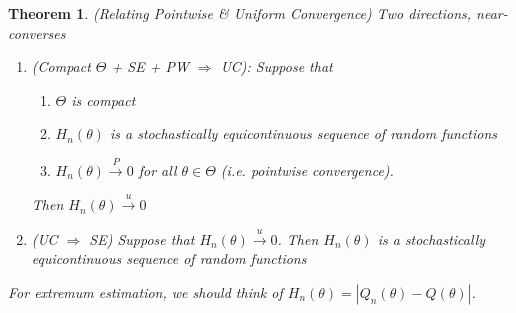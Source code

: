 \documentclass[12pt]{article}
\theoremstyle{plain}
\newtheorem{thm}{Theorem}[section]
\theoremstyle{definition}
\theoremstyle{remark}
\newcommand{\pto}{\xrightarrow{P}}
\newcommand{\uto}{\xrightarrow{u}}
\begin{document}
\clearpage
\begin{thm}\emph{(Relating Pointwise \& Uniform Convergence)}
Two directions, near-converses
\begin{enumerate}[label=\emph{(\alph*)}]
  \item \emph{(Compact $\Theta$ + SE + PW $\Rightarrow$ UC)}:
    Suppose that
    \begin{enumerate}[label=\emph{(\roman*)}]
      \item $\Theta$ is compact
      \item $H_n(\theta)$ is a stochastically equicontinuous sequence of
        random functions
      \item $H_n(\theta)\pto 0$ for all $\theta\in\Theta$ (i.e.
        pointwise convergence).
    \end{enumerate}
    Then $H_n(\theta)\uto 0$
  \item \emph{(UC $\Rightarrow$ SE)}
    Suppose that $H_n(\theta)\uto 0$.
    Then $H_n(\theta)$ is a stochastically equicontinuous sequence of
    random functions
\end{enumerate}
For extremum estimation, we should think of
$H_n(\theta)=|Q_n(\theta)-Q(\theta)|$.
\end{thm}
\end{document}
